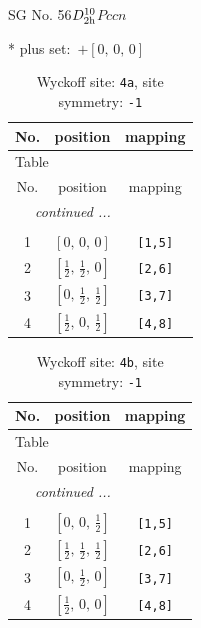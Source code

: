 \documentclass[fleqn,8pt]{jsarticle}
\begin{document}
\setcounter{MaxMatrixCols}{32}

\renewcommand{\tablename}{Table~}
\renewcommand{\figurename}{Figure~}
\begin{center}
\LARGE
SG No. 56\quad$D_{\rm 2h}^{10}$\quad$Pccn$\quad[ orthorhombic ]
\end{center}
* plus set:\,\,\,$+\left[ 0,\, 0,\, 0 \right]$
\renewcommand{\arraystretch}{1.2}
\begin{longtable}{ccc}
\caption{Wyckoff site: {\tt 4a}, site symmetry: {\tt -1}}
 \\
 \hline \hline
No. & position & mapping \\ \hline \endfirsthead

\multicolumn{2}{l}{\tablename\ \thetable{}} \\
 \hline \hline
No. & position & mapping \\ \hline \endhead

 \hline \hline
\multicolumn{2}{r}{\footnotesize\it continued ...} \\ \endfoot

 \hline \hline
\multicolumn{2}{r}{} \\ \endlastfoot

1 & $\left[ 0,\, 0,\, 0 \right]$ & {\tt [1,5]} \\ \hline
2 & $\left[ \frac{1}{2},\, \frac{1}{2},\, 0 \right]$ & {\tt [2,6]} \\ \hline
3 & $\left[ 0,\, \frac{1}{2},\, \frac{1}{2} \right]$ & {\tt [3,7]} \\ \hline
4 & $\left[ \frac{1}{2},\, 0,\, \frac{1}{2} \right]$ & {\tt [4,8]} \\
\end{longtable}
\renewcommand{\arraystretch}{1.2}
\begin{longtable}{ccc}
\caption{Wyckoff site: {\tt 4b}, site symmetry: {\tt -1}}
 \\
 \hline \hline
No. & position & mapping \\ \hline \endfirsthead

\multicolumn{2}{l}{\tablename\ \thetable{}} \\
 \hline \hline
No. & position & mapping \\ \hline \endhead

 \hline \hline
\multicolumn{2}{r}{\footnotesize\it continued ...} \\ \endfoot

 \hline \hline
\multicolumn{2}{r}{} \\ \endlastfoot

1 & $\left[ 0,\, 0,\, \frac{1}{2} \right]$ & {\tt [1,5]} \\ \hline
2 & $\left[ \frac{1}{2},\, \frac{1}{2},\, \frac{1}{2} \right]$ & {\tt [2,6]} \\ \hline
3 & $\left[ 0,\, \frac{1}{2},\, 0 \right]$ & {\tt [3,7]} \\ \hline
4 & $\left[ \frac{1}{2},\, 0,\, 0 \right]$ & {\tt [4,8]} \\
\end{longtable}
\end{document}
